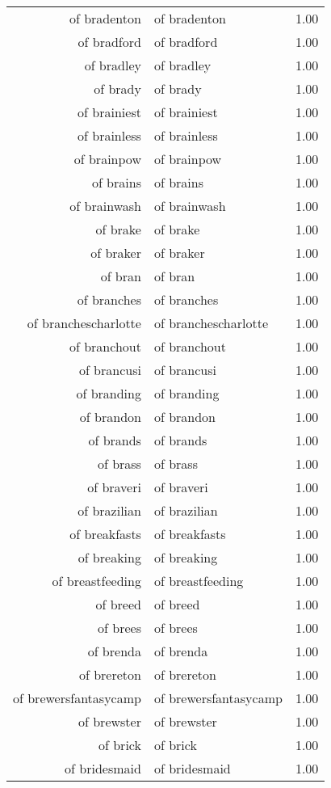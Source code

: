 \begin{table}[ht]
\begin{tabular}{rlr}
  of bradenton & of bradenton & 1.00 \\ 
  of bradford & of bradford & 1.00 \\ 
  of bradley & of bradley & 1.00 \\ 
  of brady & of brady & 1.00 \\ 
  of brainiest & of brainiest & 1.00 \\ 
  of brainless & of brainless & 1.00 \\ 
  of brainpow & of brainpow & 1.00 \\ 
  of brains & of brains & 1.00 \\ 
  of brainwash & of brainwash & 1.00 \\ 
  of brake & of brake & 1.00 \\ 
  of braker & of braker & 1.00 \\ 
  of bran & of bran & 1.00 \\ 
  of branches & of branches & 1.00 \\ 
  of branchescharlotte & of branchescharlotte & 1.00 \\ 
  of branchout & of branchout & 1.00 \\ 
  of brancusi & of brancusi & 1.00 \\ 
  of branding & of branding & 1.00 \\ 
  of brandon & of brandon & 1.00 \\ 
  of brands & of brands & 1.00 \\ 
  of brass & of brass & 1.00 \\ 
  of braveri & of braveri & 1.00 \\ 
  of brazilian & of brazilian & 1.00 \\ 
  of breakfasts & of breakfasts & 1.00 \\ 
  of breaking & of breaking & 1.00 \\ 
  of breastfeeding & of breastfeeding & 1.00 \\ 
  of breed & of breed & 1.00 \\ 
  of brees & of brees & 1.00 \\ 
  of brenda & of brenda & 1.00 \\ 
  of brereton & of brereton & 1.00 \\ 
  of brewersfantasycamp & of brewersfantasycamp & 1.00 \\ 
  of brewster & of brewster & 1.00 \\ 
  of brick & of brick & 1.00 \\ 
  of bridesmaid & of bridesmaid & 1.00 \\ 

\end{tabular}
\end{table}

